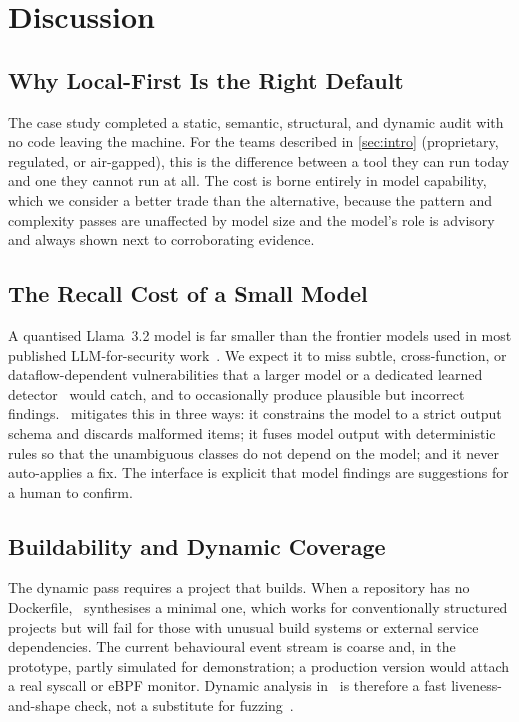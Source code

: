 \section{Discussion}
\label{sec:discussion}

\subsection{Why Local-First Is the Right Default}
The case study completed a static, semantic, structural, and dynamic
audit with no code leaving the machine. For the teams described in
\cref{sec:intro} (proprietary, regulated, or air-gapped), this is the
difference between a tool they can run today and one they cannot run at
all. The cost is borne entirely in model capability, which we consider a
better trade than the alternative, because the pattern and complexity
passes are unaffected by model size and the model's role is advisory and
always shown next to corroborating evidence.

\subsection{The Recall Cost of a Small Model}
A quantised \mbox{Llama~3.2} model is far smaller than the frontier models
used in most published LLM-for-security
work~\cite{pearce2023,khoury2023}. We expect it to miss subtle,
cross-function, or dataflow-dependent vulnerabilities that a larger model
or a dedicated learned detector~\cite{fu2022linevul} would catch, and to
occasionally produce plausible but incorrect findings. \cs\ mitigates
this in three ways: it constrains the model to a strict output schema and
discards malformed items; it fuses model output with deterministic rules
so that the unambiguous classes do not depend on the model; and it never
auto-applies a fix. The interface is explicit that model findings are
suggestions for a human to confirm.

\subsection{Buildability and Dynamic Coverage}
The dynamic pass requires a project that builds. When a repository has no
Dockerfile, \cs\ synthesises a minimal one, which works for
conventionally structured projects but will fail for those with unusual
build systems or external service dependencies. The current behavioural
event stream is coarse and, in the prototype, partly simulated for
demonstration; a production version would attach a real syscall or eBPF
monitor. Dynamic analysis in \cs\ is therefore a fast liveness-and-shape
check, not a substitute for fuzzing~\cite{manes2021}.

